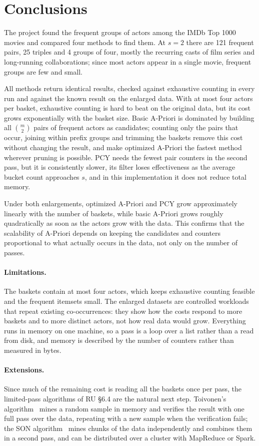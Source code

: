 \section{Conclusions}
\label{sec:conclusions}

The project found the frequent groups of actors among the IMDb Top 1000 movies and compared four methods to find them. At $s = 2$ there are 121 frequent pairs, 25 triples and 4 groups of four, mostly the recurring casts of film series and long-running collaborations; since most actors appear in a single movie, frequent groups are few and small.

All methods return identical results, checked against exhaustive counting in every run and against the known result on the enlarged data. With at most four actors per basket, exhaustive counting is hard to beat on the original data, but its cost grows exponentially with the basket size. Basic A-Priori is dominated by building all $\binom{m}{2}$ pairs of frequent actors as candidates; counting only the pairs that occur, joining within prefix groups and trimming the baskets remove this cost without changing the result, and make optimized A-Priori the fastest method wherever pruning is possible. PCY needs the fewest pair counters in the second pass, but it is consistently slower, its filter loses effectiveness as the average bucket count approaches $s$, and in this implementation it does not reduce total memory.

Under both enlargements, optimized A-Priori and PCY grow approximately linearly with the number of baskets, while basic A-Priori grows roughly quadratically as soon as the actors grow with the data. This confirms that the scalability of A-Priori depends on keeping the candidates and counters proportional to what actually occurs in the data, not only on the number of passes.

\paragraph{Limitations.} The baskets contain at most four actors, which keeps exhaustive counting feasible and the frequent itemsets small. The enlarged datasets are controlled workloads that repeat existing co-occurrences: they show how the costs respond to more baskets and to more distinct actors, not how real data would grow. Everything runs in memory on one machine, so a pass is a loop over a list rather than a read from disk, and memory is described by the number of counters rather than measured in bytes.

\paragraph{Extensions.} Since much of the remaining cost is reading all the baskets once per pass, the limited-pass algorithms of RU \S6.4 are the natural next step. Toivonen's algorithm~\cite{toivonen1996} mines a random sample in memory and verifies the result with one full pass over the data, repeating with a new sample when the verification fails; the SON algorithm~\cite{savasere1995} mines chunks of the data independently and combines them in a second pass, and can be distributed over a cluster with MapReduce or Spark.
